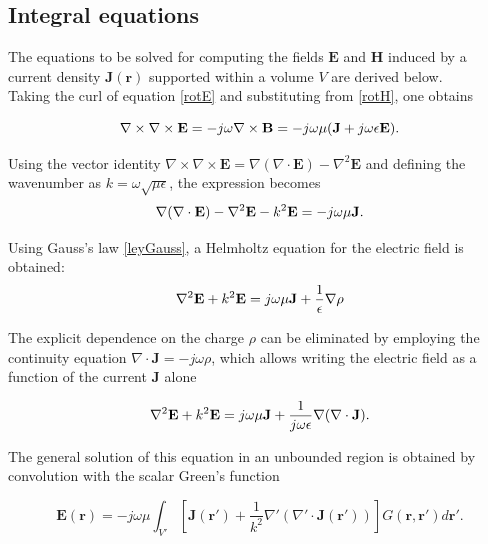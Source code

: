 \documentclass[11pt,a4paper,twoside,pdf]{article}
\numberwithin{equation}{section}
\begin{document}




\subsection{Integral equations}


The equations to be solved for computing the fields $\mathbf{E}$ and $\mathbf{H}$ induced by a current density $\mathbf{J(r)}$ supported within a volume $V$ are derived below.\\

Taking the curl of equation \ref{rotE} and substituting from \ref{rotH}, one obtains

\begin{equation}
\nabla \times \nabla \times \mathbf{E} = -j\omega\nabla \times \mathbf{B} = -j\omega\mu(\mathbf{J} + j\omega\epsilon\mathbf{E}).
\notag
\end{equation}

Using the vector identity $\nabla \times \nabla \times \mathbf{E} = \nabla(\nabla \cdot \mathbf{E}) - \nabla^2 \mathbf{E}$ and defining the wavenumber as $k = \omega\sqrt{\mu\epsilon}$, the expression becomes
\begin{equation}
\nabla(\nabla \cdot \mathbf{E}) - \nabla^2 \mathbf{E} - k^2\mathbf{E} = -j\omega\mu\mathbf{J}.
\notag
\end{equation}

Using Gauss's law \ref{leyGauss}, a Helmholtz equation for the electric field is obtained:
\begin{equation}
\nabla^2 \mathbf{E} + k^2 \mathbf{E} = j\omega\mu\mathbf{J} + \frac{1}{\epsilon}\nabla\rho
\notag
\end{equation}

The explicit dependence on the charge $\rho$ can be eliminated by employing the continuity equation $\nabla \cdot \mathbf{J} = -j\omega\rho$, which allows writing the electric field as a function of the current $\mathbf{J}$ alone

\begin{equation}
\nabla^2 \mathbf{E} + k^2 \mathbf{E} = j\omega\mu\mathbf{J} + \frac{1}{j\omega\epsilon}\nabla(\nabla \cdot \mathbf{J}).
\notag
\end{equation}

The general solution of this equation in an unbounded region is obtained by convolution with the scalar Green's function

\begin{equation}
\mathbf{E}(\mathbf{r}) = -j\omega\mu \int_{V'}   \left[  \mathbf{J}(\mathbf{r}') + \frac{1}{k^2} \nabla' (\nabla' \cdot \mathbf{J}(\mathbf{r}'))  \right] G(\mathbf{r}, \mathbf{r}') d\bm{r'}.
\label{Epuro}
\end{equation}
\end{document}
